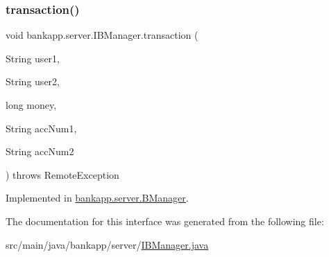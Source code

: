 \subsubsection{\texorpdfstring{transaction()}{transaction()}}
{\footnotesize\ttfamily void bankapp.\+server.\+I\+B\+Manager.\+transaction (\begin{DoxyParamCaption}\item[{String}]{user1,  }\item[{String}]{user2,  }\item[{long}]{money,  }\item[{String}]{acc\+Num1,  }\item[{String}]{acc\+Num2 }\end{DoxyParamCaption}) throws Remote\+Exception}



Implemented in \hyperlink{classbankapp_1_1server_1_1_b_manager_a5ce24fa69bd4bd08ef793072495b84b4}{bankapp.\+server.\+B\+Manager}.



The documentation for this interface was generated from the following file\+:\begin{DoxyCompactItemize}
\item 
src/main/java/bankapp/server/\hyperlink{_i_b_manager_8java}{I\+B\+Manager.\+java}\end{DoxyCompactItemize}
